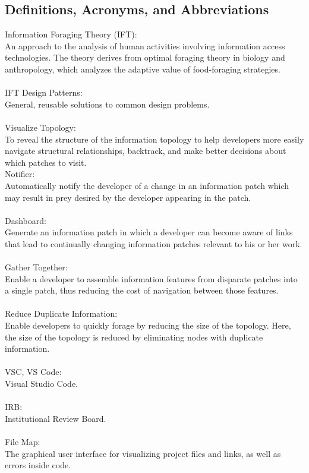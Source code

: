 \documentclass[letterpaper,10pt,titlepage,draftclsnofoot,onecolumn,onesided] {IEEEtran}
\begin{document}
\subsection{Definitions, Acronyms, and Abbreviations}
\setlength\parindent{0pt}Information Foraging Theory (IFT): \\
An approach to the analysis of human activities involving information access technologies. The theory derives from optimal foraging theory in biology and anthropology, which analyzes the adaptive value of food-foraging strategies.\cite{xeroxift}\\\\
IFT Design Patterns: \\
General, reusable solutions to common design problems.\cite{iftwiki}\\\\
Visualize Topology: \\
To reveal the structure of the information topology to help developers more easily navigate structural relationships, backtrack, and make better decisions about which patches to visit.\cite{iftwiki}\\
Notifier: \\
Automatically notify the developer of a change in an information patch which may result in prey desired by the developer appearing in the patch.\cite{iftwiki}\\\\
Dashboard: \\
Generate an information patch in which a developer can become aware of links that lead to continually changing information patches relevant to his or her work.\cite{iftwiki}\\\\
Gather Together: \\
Enable a developer to assemble information features from disparate patches into a single patch, thus reducing the cost of navigation between those features.\cite{iftwiki}\\\\
Reduce Duplicate Information: \\
Enable developers to quickly forage by reducing the size of the topology. Here, the size of the topology is reduced by eliminating nodes with duplicate information.\cite{iftwiki}\\\\
VSC, VS Code:\\
Visual Studio Code.\\\\
IRB: \\
Institutional Review Board.\\\\
File Map: \\
The graphical user interface for visualizing project files and links, as well as errors inside code.
\end{document}

